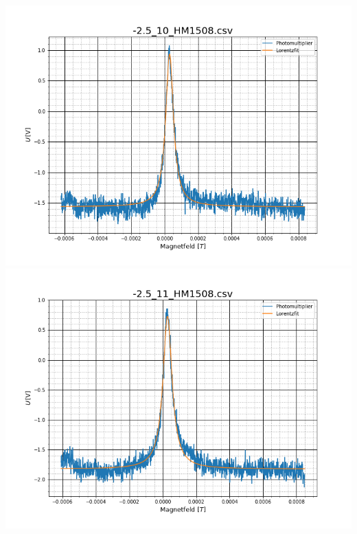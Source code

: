 \begin{center}
\includegraphics[scale=0.3]{Bild/Anhang/Statistik/stat11}
\includegraphics[scale=0.3]{Bild/Anhang/Statistik/stat12}\\


\end{center}
